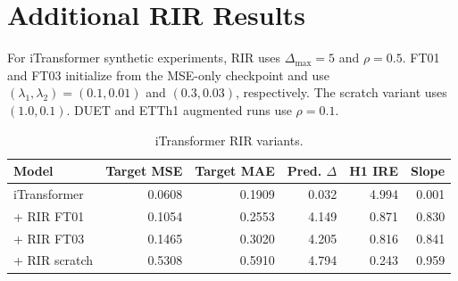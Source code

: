 \documentclass{article}
\begin{document}
\begin{table}[htbp]
\centering
\caption{Look-back window robustness for DUET-Mix baseline on the controlled
synthetic benchmark. Prediction length is fixed to 96. The expected H1 response to
$C_T\leftarrow C_T+5$ is approximately $5.000$.}
\label{tab:app_lookback}
\end{table}

\section{Additional RIR Results}
\label{app:rir}

For iTransformer synthetic experiments, RIR uses $\Delta_{\max}=5$ and $\rho=0.5$.
FT01 and FT03 initialize from the MSE-only checkpoint and use
$(\lambda_1,\lambda_2)=(0.1,0.01)$ and $(0.3,0.03)$, respectively. The scratch
variant uses $(1.0,0.1)$. DUET and ETTh1 augmented runs use $\rho=0.1$.

\begin{table}[htbp]
\centering
\caption{iTransformer RIR variants.}
\label{tab:app_itransformer_rir}
\begin{tabular}{lrrrrr}
\toprule
Model & Target MSE & Target MAE & Pred. $\Delta$ & H1 IRE & Slope \\
\midrule
iTransformer & 0.0608 & 0.1909 & 0.032 & 4.994 & 0.001 \\
+ RIR FT01 & 0.1054 & 0.2553 & 4.149 & 0.871 & 0.830 \\
+ RIR FT03 & 0.1465 & 0.3020 & 4.205 & 0.816 & 0.841 \\
+ RIR scratch & 0.5308 & 0.5910 & 4.794 & 0.243 & 0.959 \\
\bottomrule
\end{tabular}
\end{table}
\end{document}
